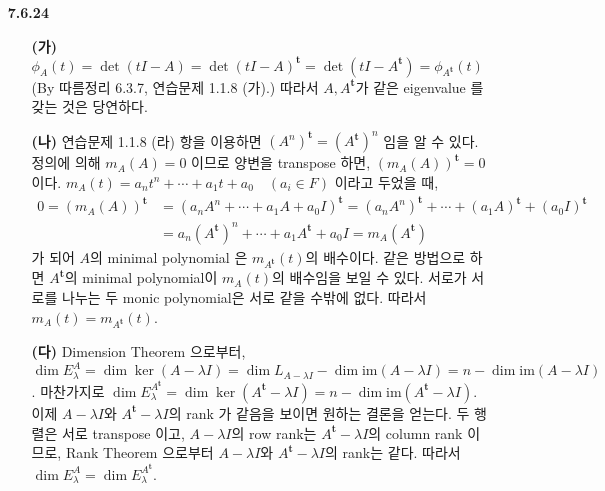 \documentclass{article}
\newcommand*{\trans}{^{\mathrm{\mathbf{t}}}}%
\begin{document}
\begin{itemize}
\item[\textbf{7.6.24}]
	\begin{itemize}
		\item[\textbf{(가)}] $\phi_A(t) = \det(tI-A) = \det(tI-A)\trans = \det(tI-A\trans) = \phi_{A\trans}(t)$ (By 따름정리 6.3.7, 연습문제 1.1.8 (가).) 따라서 $A, A\trans$가 같은 eigenvalue 를 갖는 것은 당연하다.
		\item[\textbf{(나)}] 연습문제 1.1.8 (라) 항을 이용하면 $(A^n)\trans=(A\trans)^n$ 임을 알 수 있다. 정의에 의해 $m_A(A) = 0$ 이므로 양변을 transpose 하면, $(m_A(A))\trans = 0$ 이다. $m_A(t) = a_nt^n + \cdots +a_1t+a_0 \quad (a_i\in F)$ 이라고 두었을 때,$$\begin{aligned}0 = (m_A(A))\trans &= (a_nA^n + \cdots + a_1A+a_0I)\trans = (a_nA^n)\trans + \cdots + (a_1A)\trans + (a_0I)\trans \\&= a_n(A\trans)^n + \cdots + a_1A\trans + a_0I = m_A(A\trans)\end{aligned}$$ 가 되어 $A$의 minimal polynomial 은 $m_{A\trans}(t)$의 배수이다. 같은 방법으로 하면 $A\trans$의 minimal polynomial이 $m_A(t)$의 배수임을 보일 수 있다. 서로가 서로를 나누는 두 monic polynomial은 서로 같을 수밖에 없다. 따라서 $m_A(t)=m_{A\trans}(t)$.
		\item[\textbf{(다)}] Dimension Theorem 으로부터, $\dim E_\lambda^A = \dim\ker(A-\lambda I) = \dim L_{A-\lambda I}  - \dim \text{im}(A-\lambda I) = n-\dim \text{im}(A-\lambda I)$. 마찬가지로 $\dim E_\lambda^{A\trans} = \dim\ker(A\trans-\lambda I) = n-\dim \text{im}(A\trans-\lambda I)$. 이제 $A-\lambda I$와 $A\trans -\lambda I$의 rank 가 같음을 보이면 원하는 결론을 얻는다. 두 행렬은 서로 transpose 이고, $A-\lambda I$의 row rank는 $A\trans - \lambda I$의 column rank 이므로, Rank Theorem 으로부터 $A - \lambda I$와 $A\trans - \lambda I$의 rank는 같다. 따라서 $\dim E_\lambda^{A} = \dim E_\lambda^{A\trans}$.
			\end{itemize}              
\end{itemize}
\end{document}
